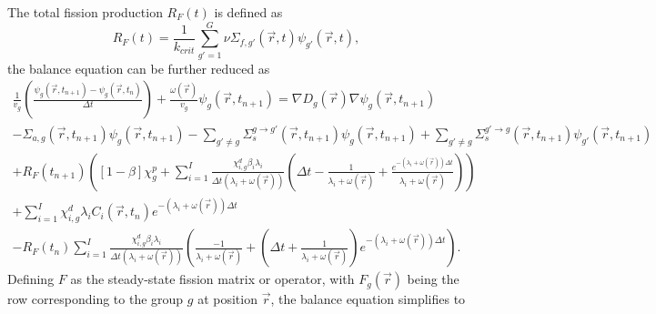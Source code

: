 \documentclass[12pt]{report}
\begin{document}
	The total fission production $R_F(t)$ is defined as
	\begin{equation}
	R_F(t) = \frac{1}{k_{crit}} \sum_{g'=1}^{G} \nu \Sigma_{f,g'}(\vec{r},t) \psi_{g'}(\vec{r},t),
	\end{equation}
	the balance equation can be further reduced as
	\begin{eqnarray}
	\frac{1}{v_g} \left(\frac{\psi_g(\vec{r},t_{n+1}) - \psi_g(\vec{r},t_{n})}{\Delta t} \right) + \frac{\omega(\vec{r})}{v_g} \psi_g(\vec{r},t_{n+1})  = \nabla D_g(\vec{r}) \nabla \psi_g(\vec{r},t_{n+1}) \nonumber \\ - \Sigma_{a,g}(\vec{r},t_{n+1}) \psi_g(\vec{r},t_{n+1}) -   \sum_{g'\neq g} \Sigma_{s}^{g\rightarrow g'} (\vec{r},t_{n+1}) \psi_g(\vec{r},t_{n+1}) + \sum_{g' \neq g} \Sigma_{s}^{g'\rightarrow g} (\vec{r},t_{n+1}) \psi_{g'}(\vec{r},t_{n+1}) \nonumber \\
	+ R_F(t_{n+1}) \left(\left[ 1- \beta \right] \chi_g^p + \sum_{i=1}^{I} \frac{\chi_{i,g}^d \beta_i \lambda_i}{\Delta t \left( \lambda_i + \omega(\vec{r}) \right)} \left( \Delta t - \frac{1}{\lambda_i + \omega(\vec{r})} + \frac{e^{-\left( \lambda_i + \omega(\vec{r})\right) \Delta t}}{\lambda_i + \omega(\vec{r})}\right) \right) \nonumber \\ +  \sum_{i=1}^{I} \chi_{i,g}^d \lambda_i C_i(\vec{r},t_{n}) e^{-\left(\lambda_i + \omega(\vec{r})\right) \Delta t} \nonumber \\
	-  R_F(t_{n}) \sum_{i=1}^{I} \frac{\chi_{i,g}^d \beta_i \lambda_i}{\Delta t \left( \lambda_i + \omega(\vec{r}) \right)} \left( \frac{-1}{\lambda_i + \omega(\vec{r})} + \left(\Delta t + \frac{1}{\lambda_i + \omega(\vec{r})} \right)e^{-\left(\lambda_i + \omega(\vec{r}) \right) \Delta t} \right)
	\nonumber.
	\end{eqnarray}
	Defining $F$ as the steady-state fission matrix or operator, with $F_g(\vec{r})$ being the row corresponding to the group $g$ at position $\vec{r}$, the balance equation simplifies to
\end{document}
